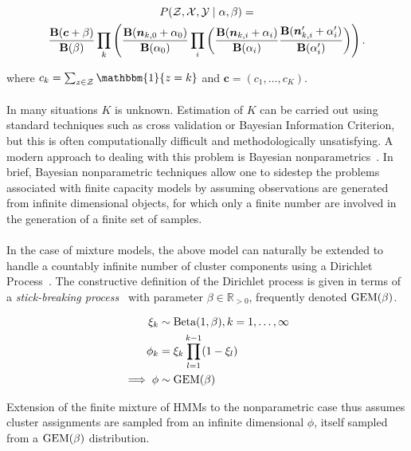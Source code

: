 \documentclass[12pt]{report}
\newcommand{\p}[0]{\prime}
\newcommand{\1}[0]{\mathbbm{1}}
\newcommand{\Beta}[0]{\textnormal{Beta}}
\newcommand{\GEM}[0]{\textnormal{GEM}}
\newcommand{\Bf}[0]{\text{\textbf{B}}}
\begin{document}
\begin{multline}
    P(\mathcal{Z}, \mathcal{X}, \mathcal{Y} \mid \alpha, \beta) = \\
    \frac{\Bf(\bm{c} + \beta)}{\Bf(\beta)}
    \prod_k
    \left(
        \frac{\Bf(\bm{n}_{k,0} + \alpha_0)}{\Bf(\alpha_0)}
        \prod_i
        \left(
            \frac{\Bf(\bm{n}_{k,i} + \alpha_i)}{\Bf(\alpha_i)}
            \frac{\Bf(\bm{n}_{k,i}^\p + \alpha_i^\p)}{\Bf(\alpha_i^\p)}
        \right)
    \right). \label{eq:joint-marg-finite-mixture}
\end{multline}

where $c_k = \sum_{z \in \mathcal{Z}}\1\{z = k\}$ and $\bm{c} = (c_1, \ldots, c_K)$.
\\\\
In many situations $K$ is unknown. Estimation of $K$ can be carried out using standard
techniques such as cross validation or Bayesian Information Criterion, but this is
often computationally difficult and methodologically unsatisfying. A modern
approach to dealing with this problem is Bayesian nonparametrics~\cite{jordan-bayesian-nonparam}.
In brief, Bayesian nonparametric techniques allow one to sidestep the problems associated with finite
capacity models by assuming observations are generated from infinite dimensional objects,
for which only a finite number are involved in the generation of a finite set of samples.
\\\\
In the case of mixture models, the above model can naturally be extended to handle a
countably infinite number of cluster components using a Dirichlet Process~\cite{teh-dirichlet}.
The constructive definition of the Dirichlet process is given in terms of a
\emph{stick-breaking process}~\cite{sethuraman-constructive} with parameter
$\beta \in \mathbb{R}_{>0}$, frequently denoted $\GEM(\beta)$.

\begin{align*}
    \xi_k & \sim \Beta(1, \beta), k = 1,\ldots,\infty\\
    \phi_k & = \xi_k \prod_{l=1}^{k-1} (1 - \xi_l) \\
    \implies \phi & \sim \GEM(\beta) \\
\end{align*}

Extension of the finite mixture of \acp{HMM} to the nonparametric case thus assumes cluster
assignments are sampled from an infinite dimensional $\phi$, itself sampled
from a $\GEM(\beta)$ distribution.
\end{document}
